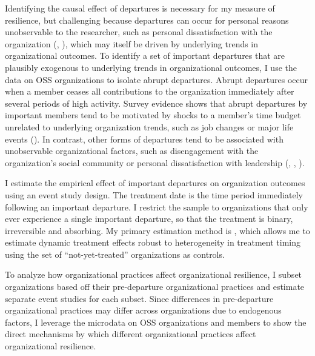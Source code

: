 \documentclass[12pt,notitlepage]{article}
\begin{document}

Identifying the causal effect of departures is necessary for my measure of resilience, but challenging because departures can occur for personal reasons unobservable to the researcher, such as personal dissatisfaction with the organization (\cite{hannon_retaining_2008}, \cite{yu_empirical_2012}), which may itself be driven by underlying trends in organizational outcomes. 
To identify a set of important departures that are plausibly exogenous to underlying trends in organizational outcomes, I use the data on OSS organizations to isolate abrupt departures. 
Abrupt departures occur when a member ceases all contributions to the organization immediately after several periods of high activity. 
Survey evidence shows that abrupt departures by important members tend to be motivated by shocks to a member's time budget unrelated to underlying organization trends, such as job changes or major life events (\cite{miller_why_2019}). 
In contrast, other forms of departures tend to be associated with unobservable organizational factors, such as disengagement with the organization's social community or personal dissatisfaction with leadership (\cite{yu_empirical_2012}, \cite{constantinou_empirical_2017}, \cite{miller_why_2019}).

I estimate the empirical effect of important departures on organization outcomes using an event study design.
The treatment date is the time period immediately following an important departure. 
I restrict the sample to organizations that only ever experience a single important departure, so that the treatment is binary, irreversible and absorbing. 
My primary estimation method is \cite{callaway_difference--differences_2021}, which allows me to estimate dynamic treatment effects robust to heterogeneity in treatment timing using the set of ``not-yet-treated'' organizations as controls. 

To analyze how organizational practices affect organizational resilience, I subset organizations based off their pre-departure organizational practices and estimate separate event studies for each subset. Since differences in pre-departure organizational practices may differ across organizations due to endogenous factors, I leverage the microdata on OSS organizations and members to show the direct mechanisms by which different organizational practices affect organizational resilience. 
\end{document}
